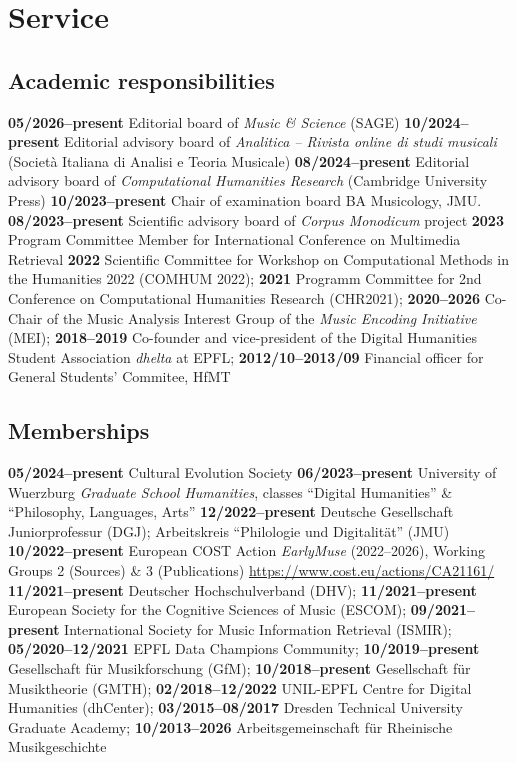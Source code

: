 \section{Service}

\subsection{Academic responsibilities}

\textbf{05/2026--present} Editorial board of \emph{Music \& Science} (SAGE)
\textbf{10/2024--present} Editorial advisory board of \emph{Analitica -- Rivista online di studi musicali} (Società Italiana di Analisi e Teoria Musicale)
\textbf{08/2024--present} Editorial advisory board of \emph{Computational Humanities Research} (Cambridge University Press)
\textbf{10/2023--present} Chair of examination board BA Musicology, JMU. 
\textbf{08/2023--present} Scientific advisory board of \textit{Corpus Monodicum} project
\textbf{2023} Program Committee Member for International Conference on Multimedia
Retrieval
\textbf{2022} Scientific Committee for Workshop on Computational Methods in the Humanities 2022 (COMHUM 2022);
\textbf{2021} Programm Committee for 2nd Conference on Computational Humanities Research (CHR2021);
\textbf{2020--2026} Co-Chair of the Music Analysis Interest Group of the \emph{Music Encoding Initiative} (MEI);
\textbf{2018--2019} Co-founder and vice-president of the Digital Humanities Student Association \emph{dhelta} at EPFL;
\textbf{2012/10--2013/09} Financial officer for General Students' Commitee, HfMT

\subsection{Memberships}

\textbf{05/2024--present} Cultural Evolution Society
\textbf{06/2023--present} University of Wuerzburg \emph{Graduate School Humanities}, classes ``Digital Humanities'' \& ``Philosophy, Languages, Arts''
\textbf{12/2022--present} Deutsche Gesellschaft Juniorprofessur (DGJ); Arbeitskreis ``Philologie und Digitalität'' (JMU)
\textbf{10/2022--present} European COST Action \emph{EarlyMuse} (2022--2026), Working Groups 2 (Sources) \& 3 (Publications) \url{https://www.cost.eu/actions/CA21161/}
\textbf{11/2021--present} Deutscher Hochschulverband (DHV);
\textbf{11/2021--present} European Society for the Cognitive Sciences of Music (ESCOM);
\textbf{09/2021--present} International Society for Music Information Retrieval (ISMIR);
\textbf{05/2020--12/2021} EPFL Data Champions Community;
\textbf{10/2019--present} Gesellschaft f{\"u}r Musikforschung (GfM);
\textbf{10/2018--present} Gesellschaft f{\"u}r Musiktheorie (GMTH);
\textbf{02/2018--12/2022} UNIL-EPFL Centre for Digital Humanities (dhCenter);
\textbf{03/2015--08/2017} Dresden Technical University Graduate Academy;
\textbf{10/2013--2026} Arbeitsgemeinschaft für Rheinische Musikgeschichte

